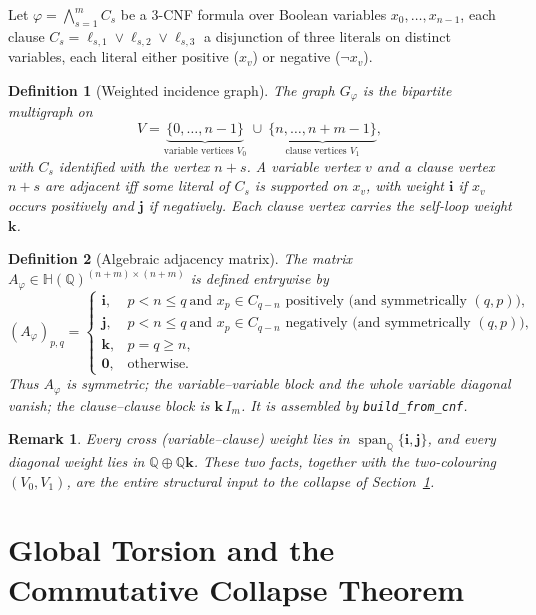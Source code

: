 \documentclass[pdflatex,sn-mathphys-num]{sn-jnl}
\theoremstyle{thmstyleone}%
\theoremstyle{thmstyletwo}%
\newtheorem{remark}{Remark}%
\theoremstyle{thmstylethree}%
\newtheorem{definition}{Definition}%
\newcommand{\HH}{\mathbb{H}}
\newcommand{\QQ}{\mathbb{Q}}
\newcommand{\bi}{\mathbf{i}}
\newcommand{\bj}{\mathbf{j}}
\newcommand{\bk}{\mathbf{k}}
\newcommand{\Aphi}{A_{\varphi}}
\newcommand{\Gphi}{G_{\varphi}}
\DeclareMathOperator{\spann}{span}
\begin{document}
Let $\varphi=\bigwedge_{s=1}^{m}C_s$ be a $3$-CNF formula over Boolean
variables $x_0,\dots,x_{n-1}$, each clause
$C_s=\ell_{s,1}\vee\ell_{s,2}\vee\ell_{s,3}$ a disjunction of three
literals on distinct variables, each literal either positive ($x_v$) or
negative ($\lnot x_v$).

\begin{definition}[Weighted incidence graph]\label{def:graph}
The graph $\Gphi$ is the bipartite multigraph on
\[
  V=\underbrace{\{0,\dots,n-1\}}_{\text{variable vertices }V_0}
   \ \cup\
   \underbrace{\{n,\dots,n+m-1\}}_{\text{clause vertices }V_1},
\]
with $C_s$ identified with the vertex $n+s$. A variable vertex $v$ and a
clause vertex $n+s$ are adjacent iff some literal of $C_s$ is supported on
$x_v$, with weight $\bi$ if $x_v$ occurs positively and $\bj$ if
negatively. Each clause vertex carries the self-loop weight $\bk$.
\end{definition}

\begin{definition}[Algebraic adjacency matrix]\label{def:matrix}
The matrix $\Aphi\in\HH(\QQ)^{(n+m)\times(n+m)}$ is defined entrywise by
\[
  (\Aphi)_{p,q}=
  \begin{cases}
    \bi, & p<n\le q\ \text{and }x_p\in C_{q-n}\text{ positively (and symmetrically }(q,p)),\\
    \bj, & p<n\le q\ \text{and }x_p\in C_{q-n}\text{ negatively (and symmetrically }(q,p)),\\
    \bk, & p=q\ge n,\\
    \mathbf 0, & \text{otherwise.}
  \end{cases}
\]
Thus $\Aphi$ is symmetric; the variable--variable block and the whole
variable diagonal vanish; the clause--clause block is $\bk\,I_m$. It is
assembled by \texttt{build\_from\_cnf}.
\end{definition}

\begin{remark}\label{rem:cross}
Every cross (variable--clause) weight lies in
$\spann_\QQ\{\bi,\bj\}$, and every diagonal weight lies in
$\QQ\oplus\QQ\bk$. These two facts, together with the two-colouring
$(V_0,V_1)$, are the entire structural input to the collapse of
Section~\ref{sec:collapse}.
\end{remark}

\section{Global Torsion and the Commutative Collapse Theorem}
\label{sec:collapse}
\end{document}
